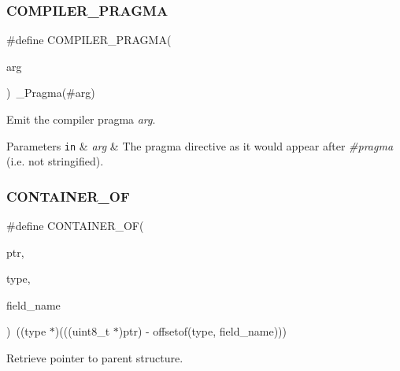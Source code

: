 \subsubsection{\texorpdfstring{C\+O\+M\+P\+I\+L\+E\+R\+\_\+\+P\+R\+A\+G\+MA}{COMPILER\_PRAGMA}}
{\footnotesize\ttfamily \#define C\+O\+M\+P\+I\+L\+E\+R\+\_\+\+P\+R\+A\+G\+MA(\begin{DoxyParamCaption}\item[{}]{arg }\end{DoxyParamCaption})~\+\_\+\+Pragma(\#arg)}



Emit the compiler pragma {\itshape arg}. 


\begin{DoxyParams}[1]{Parameters}
\mbox{\tt in}  & {\em arg} & The pragma directive as it would appear after {\itshape \#pragma} (i.\+e. not stringified). \\
\hline
\end{DoxyParams}
\mbox{\label{group__doc__driver__hal__utils__macro_gae5f8e0a04e100a3953e38a3c7bdbc4f4}} 
\subsubsection{\texorpdfstring{C\+O\+N\+T\+A\+I\+N\+E\+R\+\_\+\+OF}{CONTAINER\_OF}}
{\footnotesize\ttfamily \#define C\+O\+N\+T\+A\+I\+N\+E\+R\+\_\+\+OF(\begin{DoxyParamCaption}\item[{}]{ptr,  }\item[{}]{type,  }\item[{}]{field\+\_\+name }\end{DoxyParamCaption})~((type $\ast$)(((uint8\+\_\+t $\ast$)ptr) -\/ offsetof(type, field\+\_\+name)))}



Retrieve pointer to parent structure. 

\mbox{\label{group__doc__driver__hal__utils__macro_gab069bfec305db5213465d3b689836404}} 
